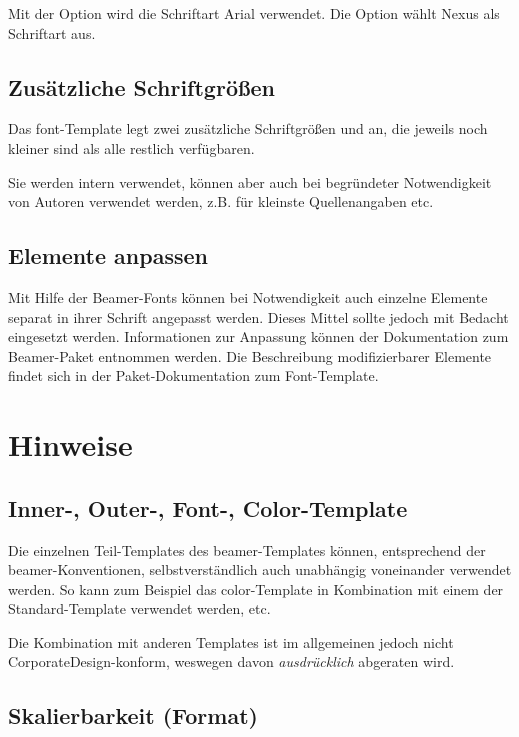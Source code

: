Mit der Option  wird die Schriftart Arial verwendet.
Die Option  wählt Nexus als Schriftart aus.

\subsection{Zusätzliche Schriftgrößen}

Das font-Template legt zwei zusätzliche Schriftgrößen 
und  an, die jeweils noch kleiner sind als alle restlich
verfügbaren.

Sie werden intern verwendet, können aber auch bei begründeter
Notwendigkeit von Autoren verwendet werden,
z.B. für kleinste Quellenangaben etc.

\subsection{Elemente anpassen}

Mit Hilfe der Beamer-Fonts können bei Notwendigkeit auch einzelne Elemente
separat in ihrer Schrift angepasst werden.
Dieses Mittel sollte jedoch mit Bedacht eingesetzt werden.
Informationen zur Anpassung können der Dokumentation zum Beamer-Paket entnommen
werden. Die Beschreibung modifizierbarer Elemente findet sich in der
Paket-Dokumentation zum Font-Template.

\section{Hinweise}

\subsection{Inner-, Outer-, Font-, Color-Template}

Die einzelnen Teil-Templates des beamer-Templates können,
entsprechend der beamer-Konventionen, selbstverständlich
auch unabhängig voneinander verwendet werden.
So kann zum Beispiel das color-Template in Kombination mit einem der
Standard-Template verwendet werden, etc.

Die Kombination mit anderen Templates ist im allgemeinen jedoch nicht
CorporateDesign-konform, weswegen davon \emph{ausdrücklich} abgeraten wird.

\subsection{Skalierbarkeit (Format)}\label{sec:beamer:hints:scale}

